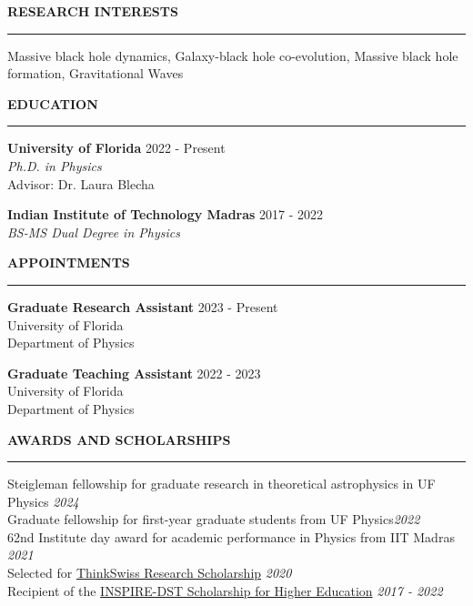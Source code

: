 \documentclass{resume} %
\renewenvironment{rSection}[1]{
\sectionskip
\textbf{\textcolor{C2}{\MakeUppercase{#1}}}
\sectionlineskip
\hrule
\begin{list}{}{
\setlength{\leftmargin}{1.5em}
}
\item[]
}{
\end{list}
}
\begin{document}
\begin{rSection}{Research Interests}
Massive black hole dynamics, Galaxy-black hole co-evolution, Massive black hole formation, Gravitational Waves

\end{rSection}

\begin{rSection}{Education}

\textbf{University of Florida} \hfill 2022 - Present \\
\emph{Ph.D. in Physics}\\
Advisor: Dr. Laura Blecha

\textbf{Indian Institute of Technology Madras} \hfill 2017 - 2022 \\
\emph{BS-MS Dual Degree in Physics}

\end{rSection}

\begin{rSection}{Appointments}

\textbf{Graduate Research Assistant
} \hfill 2023 - Present \\
University of Florida \\
Department of Physics 

\textbf{Graduate Teaching Assistant
} \hfill 2022 - 2023 \\
University of Florida \\
Department of Physics 

\end{rSection}

\begin{rSection}{Awards and scholarships} \itemsep -2pt 
{{\color{C3} Steigleman fellowship} for graduate research in theoretical astrophysics in UF Physics} \hfill {\em 2024}\\
{{\color{C3} Graduate fellowship} for first-year graduate students from UF Physics}\hfill {\em 2022} \\
{{\color{C3} 62nd Institute day} award for academic performance in Physics from IIT Madras} \hfill {\em 2021} \\
{Selected for \href{https://swissnex.org/india/thinkswiss/}{ThinkSwiss Research Scholarship}} \hfill {\em 2020}\\
{Recipient of the \href{http://www.inspire-dst.gov.in/scholarship.html}{INSPIRE-DST Scholarship for Higher Education}} \hfill {\em 2017 - 2022}
\end{rSection}
\end{document}
